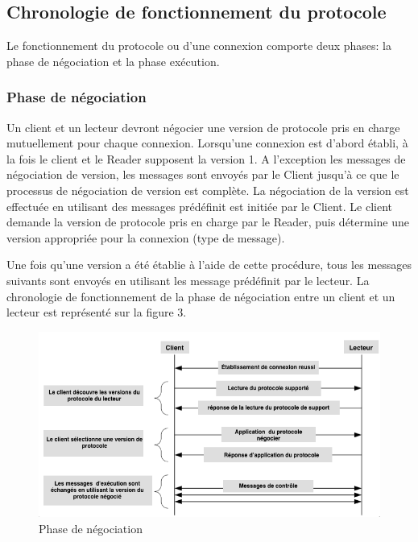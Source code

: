 \documentclass[11pt, a4paper, twoside]{book}
\begin{document}
\subsection{Chronologie de fonctionnement du protocole}
Le fonctionnement du protocole ou d'une connexion comporte deux phases: la phase de négociation et la phase exécution.
\subsubsection{Phase de négociation}
Un client et un lecteur devront négocier une version de protocole pris en charge mutuellement pour chaque connexion. Lorsqu'une connexion  est d'abord établi, à la fois le client et le Reader supposent  la version 1. A l'exception les messages de négociation de version, les messages sont envoyés par le Client  jusqu'à ce que le processus de négociation de version est complète. La négociation de la version est effectuée en utilisant des messages prédéfinit est initiée par le Client. Le client demande la version de protocole pris en charge par le Reader, puis détermine une version appropriée pour la connexion (type de message).
 
Une fois qu'une version a été établie à l'aide de cette procédure, tous les messages suivants sont envoyés en utilisant les message prédéfinit par le lecteur. La chronologie de fonctionnement de la phase de négociation  entre un client et un lecteur est représenté sur la figure 3.
\begin{figure}[H]
\centering
\includegraphics[width=\textwidth]{negotiation2}
\caption{Phase de négociation}
\end{figure}
\end{document}
